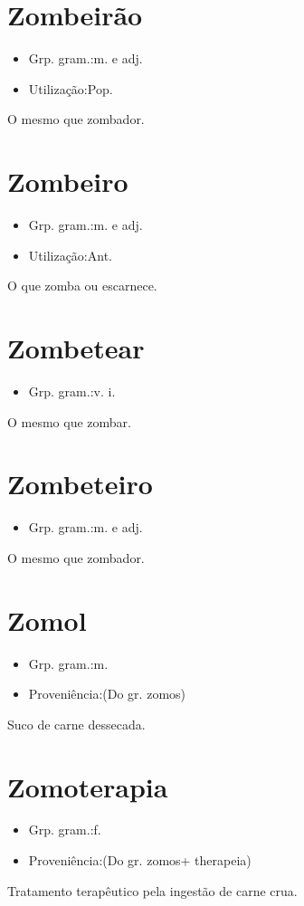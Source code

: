 \section{Zombeirão}
\begin{itemize}
\item {Grp. gram.:m.  e  adj.}
\end{itemize}
\begin{itemize}
\item {Utilização:Pop.}
\end{itemize}
O mesmo que \textunderscore zombador\textunderscore .
\section{Zombeiro}
\begin{itemize}
\item {Grp. gram.:m.  e  adj.}
\end{itemize}
\begin{itemize}
\item {Utilização:Ant.}
\end{itemize}
O que zomba ou escarnece.
\section{Zombetear}
\begin{itemize}
\item {Grp. gram.:v. i.}
\end{itemize}
O mesmo que \textunderscore zombar\textunderscore .
\section{Zombeteiro}
\begin{itemize}
\item {Grp. gram.:m.  e  adj.}
\end{itemize}
O mesmo que \textunderscore zombador\textunderscore .
\section{Zomol}
\begin{itemize}
\item {Grp. gram.:m.}
\end{itemize}
\begin{itemize}
\item {Proveniência:(Do gr. \textunderscore zomos\textunderscore )}
\end{itemize}
Suco de carne dessecada.
\section{Zomoterapia}
\begin{itemize}
\item {Grp. gram.:f.}
\end{itemize}
\begin{itemize}
\item {Proveniência:(Do gr. \textunderscore zomos\textunderscore  + \textunderscore therapeia\textunderscore )}
\end{itemize}
Tratamento terapêutico pela ingestão de carne crua.
